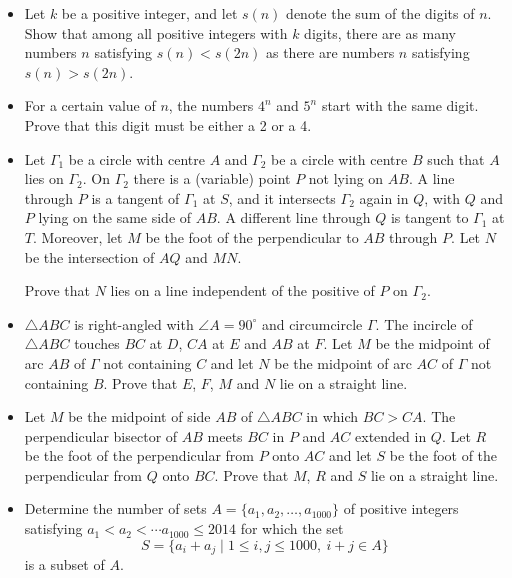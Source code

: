 \documentclass[12pt]{article}
\begin{document}
\begin{itemize}
\item %
Let $k$ be a positive integer, and let $s(n)$ denote the sum of the digits of $n$. Show that among all positive integers with $k$ digits, there are as many numbers $n$ satisfying $s(n)<s(2n)$ as there are numbers $n$ satisfying $s(n)>s(2n)$.


\item %
For a certain value of $n$, the numbers $4^n$ and $5^n$ start with the same digit. Prove that this digit must be either a 2 or a 4.


\item %
Let $\Gamma_1$ be a circle with centre $A$ and $\Gamma_2$ be a circle with centre $B$ such that $A$ lies on $\Gamma_2$. On $\Gamma_2$ there is a (variable) point $P$ not lying on $AB$. A line through $P$ is a tangent of $\Gamma_1$ at $S$, and it intersects $\Gamma_2$ again in $Q$, with $Q$ and $P$ lying on the same side of $AB$. A different line through $Q$ is tangent to $\Gamma_1$ at $T$. Moreover, let $M$ be the foot of the perpendicular to $AB$ through $P$. Let $N$ be the intersection of $AQ$ and $MN$. 
	
Prove that $N$ lies on a line independent of the positive of $P$ on $\Gamma_2$.


\item %
$\triangle ABC$ is right-angled with $\angle A=90^\circ$ and circumcircle $\Gamma$. The incircle of $\triangle ABC$ touches $BC$ at $D$, $CA$ at $E$ and $AB$ at $F$. Let $M$ be the midpoint of arc $AB$ of $\Gamma$ not containing $C$ and let $N$ be the midpoint of arc $AC$ of $\Gamma$ not containing $B$. Prove that $E$, $F$, $M$ and $N$ lie on a straight line.


\item %
Let $M$ be the midpoint of side $AB$ of $\triangle ABC$ in which $BC>CA$. The perpendicular bisector of $AB$ meets $BC$ in $P$ and $AC$ extended in $Q$. Let $R$ be the foot of the perpendicular from $P$ onto $AC$ and let $S$ be the foot of the perpendicular from $Q$ onto $BC$. Prove that $M$, $R$ and $S$ lie on a straight line.


\item %
Determine the number of sets $A=\{a_1,a_2,\ldots, a_{1000}\}$ of positive integers satisfying $a_1<a_2<\cdots a_{1000}\le 2014$ for which the set
	\[ S = \{a_i+a_j\mid 1\le i,j\le 1000,\ i+j\in A\} \]
is a subset of $A$.


\end{itemize}
\end{document}
